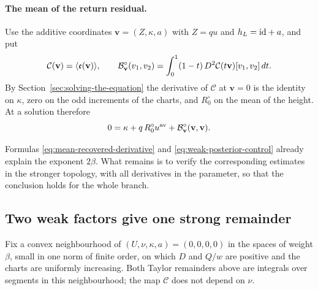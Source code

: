 \paragraph{The mean of the return residual.}
Use the additive coordinates $\mathbf v=(Z,\kappa,a)$ with $Z=qu$
and $h_L=\mathrm{id}+a$, and put
\[
 \mathcal C(\mathbf v)=\langle \mathfrak e(\mathbf v)\rangle,
 \qquad
 \mathcal B^\circ_{\mathbf v}(v_1,v_2)
 =\int_0^1(1-t)\,D^2\mathcal C(t\mathbf v)[v_1,v_2]\,dt .
\]
By Section~\ref{sec:solving-the-equation} the derivative of
$\mathcal C$ at $\mathbf v=0$ is the identity on $\kappa$, zero on
the odd increments of the charts, and $R_0^\circ$ on the mean of the
height. At a solution therefore
\begin{equation}\label{eq:weak-posterior-control}
 0=\kappa+q\,R_0^\circ u^{\rm av}
       +\mathcal B^\circ_{\mathbf v}(\mathbf v,\mathbf v) .
\end{equation}

Formulas \eqref{eq:mean-recovered-derivative} and
\eqref{eq:weak-posterior-control} already explain the exponent
$2\beta$. What remains is to verify the corresponding estimates in
the stronger topology, with all derivatives in the parameter, so that
the conclusion holds for the whole branch.

\subsection{Two weak factors give one strong remainder}

Fix a convex neighbourhood of $(U,\nu,\kappa,a)=(0,0,0,0)$ in the
spaces of weight $\beta$, small in one norm of finite order, on which
$D$ and $Q/w$ are positive and the charts are uniformly increasing.
Both Taylor remainders above are integrals over segments in this
neighbourhood; the map $\mathcal C$ does not depend on $\nu$.

